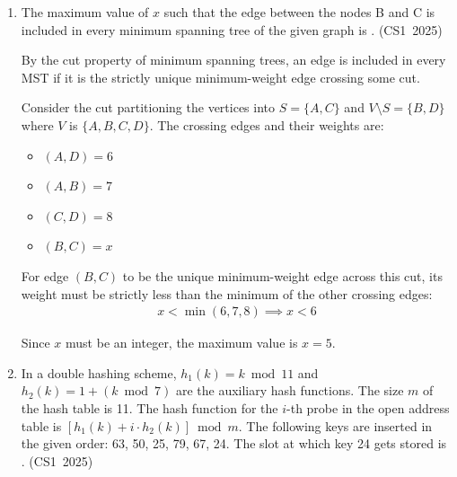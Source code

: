 \begin{enumerate}[label=\thesubsection.\arabic*, ref=\thesubsection.\theenumi]
Therefore, the value printed by the program is $46$.

\vspace{0.5cm}
\item The maximum value of $x$ such that the edge between the nodes B and C is included in every minimum spanning tree of the given graph is \underline{\hspace{1cm}}.
\hfill (CS1~2025)

\begin{figure}[H]
    \centering
    
\end{figure}

\vspace{0.2cm}
\solution
By the cut property of minimum spanning trees, an edge is included in every MST if it is the strictly unique minimum-weight edge crossing some cut. 

Consider the cut partitioning the vertices into $S = \{A, C\}$ and $V \setminus S = \{B, D\}$ where $V$ is $\{A, B, C, D\}$. The crossing edges and their weights are:
\begin{itemize}
    \item $(A, D) = 6$
    \item $(A, B) = 7$
    \item $(C, D) = 8$
    \item $(B, C) = x$
\end{itemize}

For edge $(B, C)$ to be the unique minimum-weight edge across this cut, its weight must be strictly less than the minimum of the other crossing edges:
\begin{align}
x < \min(6, 7, 8) \implies x < 6
\end{align}

Since $x$ must be an integer, the maximum value is $x = 5$.

\vspace{0.5cm}
\item In a double hashing scheme, $h_1(k) = k \bmod 11$ and $h_2(k) = 1 + (k \bmod 7)$ are the auxiliary hash functions. The size $m$ of the hash table is 11. The hash function for the $i$-th probe in the open address table is $[h_1(k) + i \cdot h_2(k)] \bmod m$. The following keys are inserted in the given order: 63, 50, 25, 79, 67, 24. The slot at which key 24 gets stored is \underline{\hspace{1cm}}.
\hfill (CS1~2025)


\end{enumerate}
